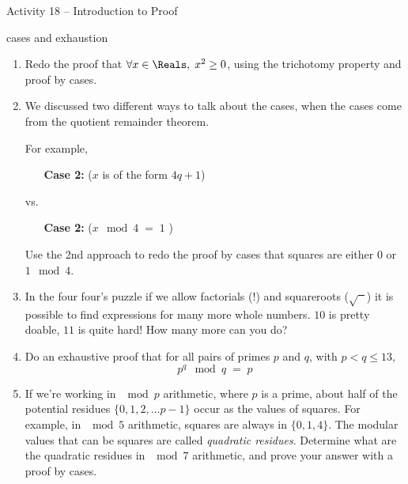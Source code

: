 \documentclass{amsart}
\begin{document}
\thispagestyle{empty}

\centerline{\Large Activity 18 -- Introduction to Proof}
\centerline{\large cases and exhaustion}

\bigskip
\Large


\begin{enumerate}

\item Redo the proof that $\forall x \in \Reals, \; x^2 \geq 0$, using the trichotomy property and proof by cases. 

\vfill

\item We discussed two different ways to talk about the cases, when the cases come from the quotient remainder theorem.

For example,

\begin{itemize}
\item[\bf Case 2:] ($x$ is of the form $4q+1$)
\end{itemize}
\noindent vs.
\begin{itemize}
\item[\bf Case 2:] ($x \mod 4 \; = \; 1$ )
\end{itemize}

Use the 2nd approach to redo the proof by cases that squares are either $0$ or $1 \mod 4$.

\vfill

\newpage

\item In the four four's puzzle if we allow factorials ($!$) and squareroots ($\sqrt{\phantom{x}}$) it is possible to find expressions for many more whole numbers.  $10$ is pretty doable, $11$ is quite hard!  How many more can you do?

\vfill

\item Do an exhaustive proof that for all pairs of primes $p$ and $q$, with $p < q \leq 13$, 
\[ p^q \mod{q} \; = \; p  \]

\vfill

\newpage

\item If we're working in $\!\!\mod{p}$ arithmetic, where $p$ is a prime, about half of the potential residues $\{0,1,2, \ldots p-1\}$ occur as the values of squares.  For example, in $\mod{5}$ arithmetic, squares are always in $\{0,1,4\}$.  The modular values that can be squares are called {\em quadratic residues}.  Determine what are the quadratic residues in $\mod{7}$ arithmetic, and prove your answer with a proof by cases.


\end{enumerate}
\end{document}
